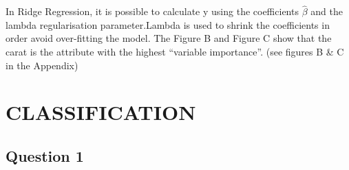 \documentclass[
]{article}
\begin{document}
In Ridge Regression, it is possible to calculate y using the
coefficients \(\hat{\beta}\) and the lambda regularisation
parameter.Lambda is used to shrink the coefficients in order avoid
over-fitting the model. The Figure B and Figure C show that the carat is
the attribute with the highest ``variable importance''. (see figures B
\& C in the Appendix)

\newpage

\hypertarget{classification}{%
\section{CLASSIFICATION}\label{classification}}

\hypertarget{question-1-1}{%
\subsection{Question 1}\label{question-1-1}}
\end{document}
